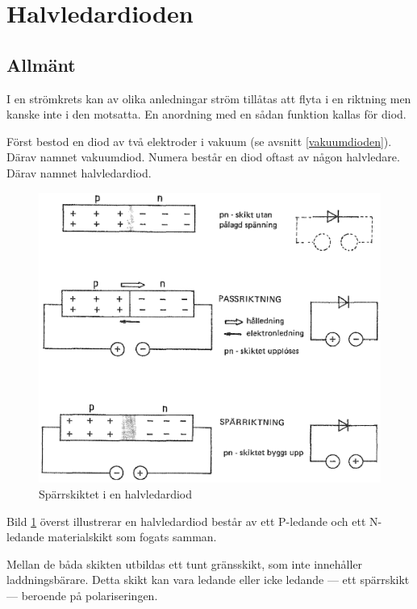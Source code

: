 \section{Halvledardioden}

\subsection{Allmänt}
I en strömkrets kan av olika anledningar ström tillåtas att flyta i en riktning
men kanske inte i den motsatta. En anordning med en sådan funktion kallas för
diod.

Först bestod en diod av två elektroder i vakuum (se avsnitt
\ref{vakuumdioden}). Därav namnet vakuumdiod.
Numera består en diod oftast av någon halvledare. Därav namnet halvledardiod.

\begin{figure}
\includegraphics[width=\textwidth]{images/cropped_pdfs/bild_2_2-12.pdf}
\caption{Spärrskiktet i en halvledardiod}
\label{fig:BildII2-12}
\end{figure}

Bild \ref{fig:BildII2-12} överst illustrerar en halvledardiod består av ett
P-ledande och ett N-ledande materialskikt som fogats samman.

Mellan de båda skikten utbildas ett tunt gränsskikt, som inte innehåller
laddningsbärare. Detta skikt kan vara ledande eller icke ledande --- ett
spärrskikt --- beroende på polariseringen.

